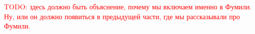 
\textcolor{red}{
TODO: здесь должно быть объяснение, почему мы включаем именно в Фумили.
Ну, или он должно появиться в предыдущей части, где мы рассказывали про Фумили.
}



%

